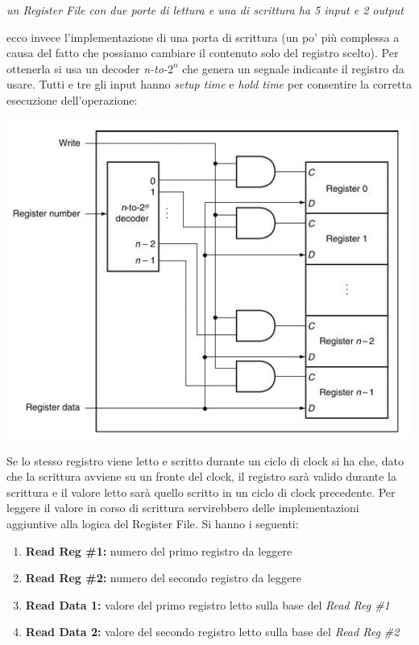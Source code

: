 \documentclass[a4paper,12pt, oneside]{book}
\begin{document}
\begin{itemize}
\begin{center}
		      \textit{un Register File con due porte di lettura e una di scrittura ha 5 input e 2 output }
	      \end{center}
	      ecco invece l'implementazione di una porta di scrittura (un po' più complessa a causa del fatto che possiamo cambiare il contenuto solo del registro scelto). Per ottenerla si usa un decoder \textit{n-to-}$2^n$ che genera un segnale indicante il registro da usare. Tutti e tre gli input hanno \textit{setup time} e \textit{hold time} per consentire la corretta esecuzione dell'operazione:
	      \begin{center}
		      \includegraphics[scale=0.6]{img/reg3.png}
	      \end{center}
	      \newpage
	      Se lo stesso registro viene letto e scritto durante un ciclo di clock si ha che, dato che la scrittura avviene su un fronte del clock, il registro sarà valido durante la scrittura e il valore letto sarà quello scritto in un ciclo di clock precedente. Per leggere il valore in corso di scrittura servirebbero delle implementazioni aggiuntive alla logica del Register File. Si hanno i seguenti:
	      \begin{enumerate}
		      \item \textbf{Read Reg \#1:} numero del primo registro da leggere
		      \item \textbf{Read Reg \#2:} numero del secondo registro da leggere
		      \item \textbf{Read Data 1:} valore del primo registro letto sulla base del \textit{Read Reg \#1}
		      \item \textbf{Read Data 2:} valore del secondo registro letto sulla base del \textit{Read Reg \#2}

\end{enumerate}
\end{itemize}
\end{document}
